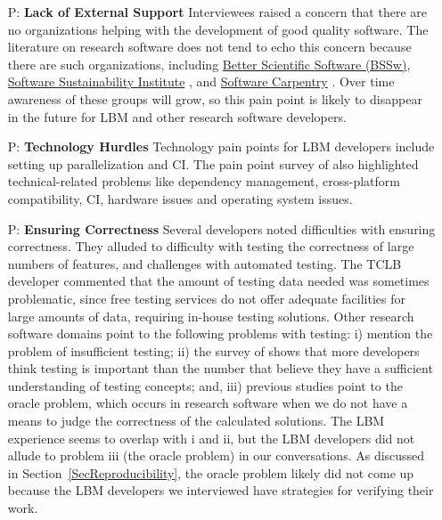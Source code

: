 \documentclass[final, 3p, times, authoryear]{elsarticle}
\newcounter{pnum} %
\begin{document}
\begin{enumerate}
	\item[P\refstepcounter{pnum}\thepnum \label{P_LackExtSupport}:] \textbf{Lack
	of External Support} Interviewees raised a concern that there are no
	organizations helping with the development of good quality software.  The
	literature on research software does not tend to echo this concern because
	there are such organizations, including \href{https://bssw.io/} {Better
	Scientific Software (BSSw)},
	\href{https://www.software.ac.uk/} {Software Sustainability Institute}
	\citep{CrouchEtAl2013}, and \href{https://software-carpentry.org/}{Software
	Carpentry} \citep{WilsonAndLumsdaine2006, Wilson2016}. Over time awareness
	of these groups will grow, so this pain point is likely to disappear in the
	future for LBM and other research software developers.
	
	\item[P\refstepcounter{pnum}\thepnum \label{P_TechnologyHurdles}:]
	\textbf{Technology Hurdles} Technology pain points for LBM developers
	include setting up parallelization and CI. The pain
	point survey of \citet{WieseEtAl2019} also highlighted technical-related
	problems like dependency management, cross-platform compatibility,
	CI, hardware issues and operating system issues.

	\item[P\refstepcounter{pnum}\thepnum \label{P_Correctness}:]
	\textbf{Ensuring Correctness} Several developers noted difficulties with
	ensuring correctness. They alluded to difficulty with testing the
	correctness of large numbers of features, and challenges with automated
	testing. The TCLB developer commented that the amount of testing data needed
	was sometimes problematic, since free testing services do not offer adequate
	facilities for large amounts of data, requiring in-house testing solutions.
	Other research software domains point to the following problems with
	testing: i) \citep{PintoEtAl2018} mention the problem of insufficient
	testing; ii) the survey of \citep{HannayEtAl2009} shows that more developers
	think testing is important than the number that believe they have a
	sufficient understanding of testing concepts; and, iii) previous studies
	\citep{HannayEtAl2009, KanewalaAndBieman2013, KellyEtAl2011, WieseEtAl2019}
	point to the oracle problem, which occurs in research software when we do
	not have a means to judge the correctness of the calculated solutions.  The
	LBM experience seems to overlap with i and ii, but the LBM developers did
	not allude to problem iii (the oracle problem) in our conversations.  As
	discussed in Section~\ref{SecReproducibility}, the oracle problem likely did
	not come up because the LBM developers we interviewed have strategies for
	verifying their work.
	

\end{enumerate}
\end{document}

